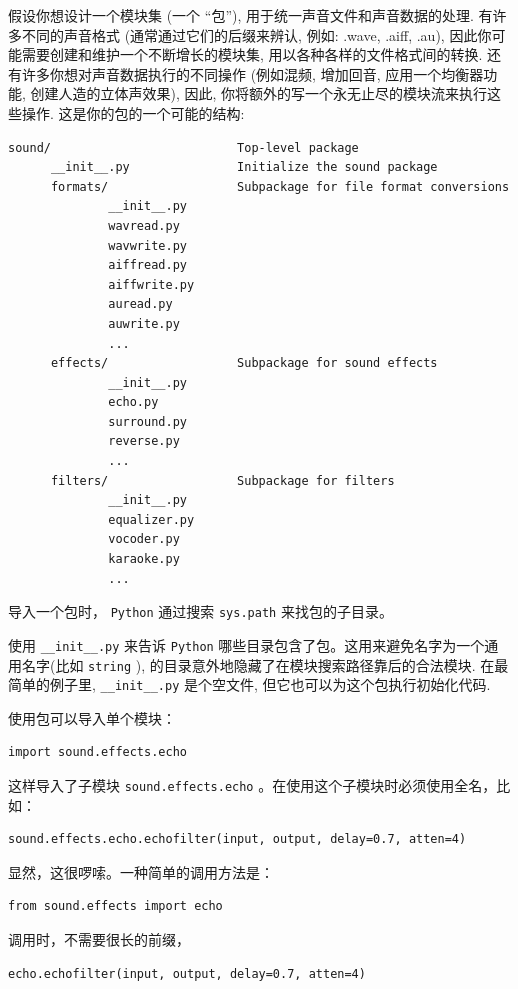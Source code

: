 \documentclass[10pt,a4paper,UTF8]{article}
\begin{document}
假设你想设计一个模块集 (一个 “包”), 用于统一声音文件和声音数据的处理. 有许多不同的声音格式 (通常通过它们的后缀来辨认, 例如: .wave, .aiff, .au), 因此你可能需要创建和维护一个不断增长的模块集, 用以各种各样的文件格式间的转换. 还有许多你想对声音数据执行的不同操作 (例如混频, 增加回音, 应用一个均衡器功能, 创建人造的立体声效果), 因此, 你将额外的写一个永无止尽的模块流来执行这些操作. 这是你的包的一个可能的结构:

\begin{verbatim}
sound/                          Top-level package
      __init__.py               Initialize the sound package
      formats/                  Subpackage for file format conversions
              __init__.py
              wavread.py
              wavwrite.py
              aiffread.py
              aiffwrite.py
              auread.py
              auwrite.py
              ...
      effects/                  Subpackage for sound effects
              __init__.py
              echo.py
              surround.py
              reverse.py
              ...
      filters/                  Subpackage for filters
              __init__.py
              equalizer.py
              vocoder.py
              karaoke.py
              ...
\end{verbatim}

导入一个包时， \texttt{Python} 通过搜索 \texttt{sys.path} 来找包的子目录。

使用 \texttt{\_\_init\_\_.py} 来告诉 \texttt{Python} 哪些目录包含了包。这用来避免名字为一个通用名字(比如 \texttt{string} ), 的目录意外地隐藏了在模块搜索路径靠后的合法模块. 在最简单的例子里,  \texttt{\_\_init\_\_.py}  是个空文件, 但它也可以为这个包执行初始化代码.

使用包可以导入单个模块：
\begin{verbatim}
import sound.effects.echo
\end{verbatim}

这样导入了子模块 \texttt{sound.effects.echo} 。在使用这个子模块时必须使用全名，比如：
\begin{verbatim}
sound.effects.echo.echofilter(input, output, delay=0.7, atten=4)
\end{verbatim}

显然，这很啰嗦。一种简单的调用方法是：
\begin{verbatim}
from sound.effects import echo
\end{verbatim}

调用时，不需要很长的前缀，
\begin{verbatim}
echo.echofilter(input, output, delay=0.7, atten=4)
\end{verbatim}
\end{document}

